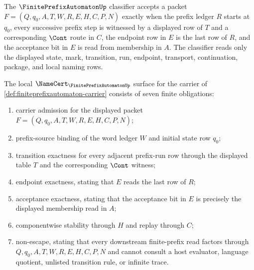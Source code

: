 \begin{definition}
\label{def:finiteprefixautomaton-classifier}
The $\FinitePrefixAutomatonUp$ classifier accepts a packet $F=(Q,q_0,A,T,W,R,E,H,C,P,N)$ exactly when the prefix ledger $R$ starts at $q_0$, every successive prefix step is witnessed by a displayed row of $T$ and a corresponding $\Cont$ route in $C$, the endpoint row in $E$ is the last row of $R$, and the acceptance bit in $E$ is read from membership in $A$. The classifier reads only the displayed state, mark, transition, run, endpoint, transport, continuation, package, and local naming rows.
\end{definition}

\begin{theorem}
\label{thm:finiteprefixautomaton-namecert-obligation-surface}
The local $\NameCert_{\FinitePrefixAutomatonUp}$ surface for the carrier of \autoref{def:finiteprefixautomaton-carrier} consists of seven finite obligations:
\begin{enumerate}
\item carrier admission for the displayed packet $F=(Q,q_0,A,T,W,R,E,H,C,P,N)$;
\item prefix-source binding of the word ledger $W$ and initial state row $q_0$;
\item transition exactness for every adjacent prefix-run row through the displayed table $T$ and the corresponding $\Cont$ witness;
\item endpoint exactness, stating that $E$ reads the last row of $R$;
\item acceptance exactness, stating that the acceptance bit in $E$ is precisely the displayed membership read in $A$;
\item componentwise stability through $H$ and replay through $C$;
\item non-escape, stating that every downstream finite-prefix read factors through $Q,q_0,A,T,W,R,E,H,C,P,N$ and cannot consult a host evaluator, language quotient, unlisted transition rule, or infinite trace.
\end{enumerate}
\end{theorem}
